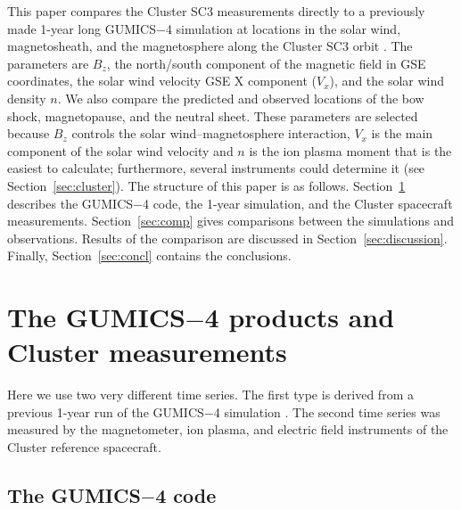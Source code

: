 \documentclass[draft]{agujournal2019}
\begin{document}
This paper compares the Cluster SC3 measurements directly to a previously made 1-year long GUMICS$-$4 simulation at locations in the solar wind, magnetosheath, and the magnetosphere along the Cluster SC3 orbit \cite{facsko16:_one_earth}. The parameters are $B_z$, the north/south component of the magnetic field in GSE coordinates, the solar wind velocity GSE X component ($V_x$), and the solar wind density $n$. We also compare the predicted and observed locations of the bow shock, magnetopause, and the neutral sheet. These parameters are selected because $B_z$ controls the solar wind--magnetosphere interaction, $V_x$ is the main component of the solar wind velocity and $n$ is the ion plasma moment that is the easiest to calculate; furthermore, several instruments could determine it (see Section~\ref{sec:cluster}). The structure of this paper is as follows. Section~\ref{sec:data} describes the GUMICS$-$4 code, the 1-year simulation, and the Cluster spacecraft measurements. Section~\ref{sec:comp} gives comparisons between the simulations and observations. Results of the comparison are discussed in Section~\ref{sec:discussion}. Finally, Section~\ref{sec:concl} contains the conclusions.

\section{The GUMICS$-$4 products and Cluster measurements}
\label{sec:data}

Here we use two very different time series. The first type is derived from a previous 1-year run of the GUMICS$-$4 simulation \cite{facsko16:_one_earth}. The second time series was measured by the magnetometer, ion plasma, and electric field instruments of the Cluster reference spacecraft.

\subsection{The GUMICS$-$4 code}
\label{sec:gumics}
\end{document}
